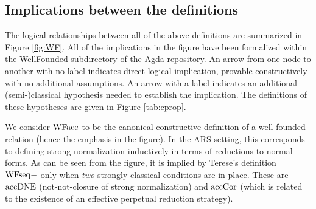 
\subsection{Implications between the definitions}

The logical relationships between all of the above definitions are summarized in Figure \ref{fig:WF}.
All of the implications in the figure have been
formalized within the WellFounded subdirectory of the Agda repository.
An arrow from one node to another with no label indicates direct logical implication,
provable constructively with no additional assumptions. An arrow with a label indicates an additional
(semi-)classical hypothesis needed to establish the implication.
The definitions of these hypotheses are given in Figure \ref{tab:cprop}.

We consider $\mathrm{WFacc}$ to be the canonical constructive definition of
a well-founded relation (hence the emphasis in the figure).
In the ARS setting, this corresponds to defining
strong normalization inductively in terms of reductions to normal forms.
As can be seen from the figure, it is implied by
Terese's definition $\mathrm{WFseq}{-}$ only when \emph{two}
strongly classical conditions are in place.
These are $\mathrm{accDNE}$ (not-not-closure of strong normalization)
and $\mathrm{accCor}$ (which is related to the existence of an effective perpetual reduction strategy).

